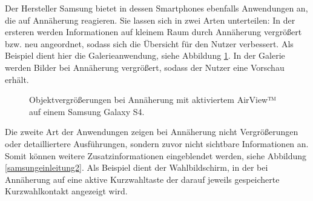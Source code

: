 \documentclass[a4paper,12pt,bibliography=totoc]{scrreprt}%
\begin{document}
Der Hersteller Samsung bietet in dessen Smartphones ebenfalls Anwendungen an, die auf Annäherung reagieren. Sie lassen sich in zwei Arten unterteilen: In der ersteren werden Informationen auf kleinem Raum durch Annäherung vergrößert bzw. neu angeordnet, sodass sich die Übersicht für den Nutzer verbessert. Als Beispiel dient hier die Galerieanwendung, siehe Abbildung \ref{samsungeinleitung1}. In der Galerie werden Bilder bei Annäherung vergrößert, sodass der Nutzer eine Vorschau erhält.
\begin{figure}
\centering
{}
\hfill
{}
\caption{Objektvergrößerungen bei Annäherung mit aktiviertem AirView™ auf einem Samsung Galaxy S4.}
\label{samsungeinleitung1}
\end{figure}
Die zweite Art der Anwendungen zeigen bei Annäherung nicht Vergrößerungen oder detailliertere Ausführungen, sondern zuvor nicht sichtbare Informationen an. Somit können weitere Zusatzinformationen eingeblendet werden, siehe Abbildung \ref{samsungeinleitung2}. Als Beispiel dient der Wahlbildschirm, in der bei Annäherung auf eine aktive Kurzwahltaste der darauf jeweils gespeicherte Kurzwahlkontakt angezeigt wird.
\end{document}
